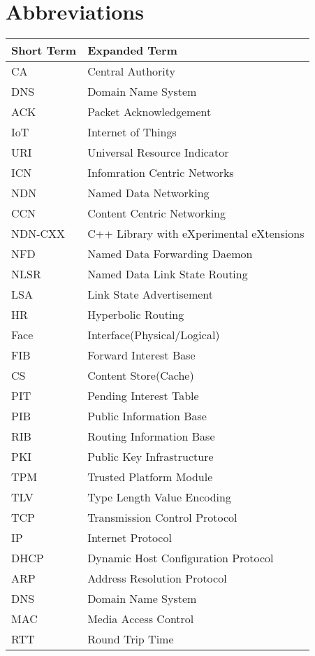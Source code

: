 \chapter{Abbreviations}

\begin{longtable}{p{40mm}|p{100mm}}
	\textbf{Short Term}&\textbf{Expanded Term}\\
	\hline
	CA & Central Authority\\
	DNS & Domain Name System\\
	ACK & Packet Acknowledgement \\ 
	IoT & Internet of Things \\  
	URI & Universal Resource Indicator \\  
	ICN & Infomration Centric Networks\\ 
	NDN & Named Data Networking \\ 
	CCN & Content Centric Networking\\ 
	NDN-CXX & C++ Library with eXperimental eXtensions \\ 
	NFD & Named Data Forwarding Daemon \\ 
	NLSR & Named Data Link State Routing \\ 
	LSA & Link State Advertisement \\ 
	HR & Hyperbolic Routing \\  
	Face & Interface(Physical/Logical)\\ 
	FIB & Forward Interest Base \\ 
	CS & Content Store(Cache) \\ 
	PIT & Pending Interest Table \\ 
	PIB & Public Information Base \\ 
	RIB & Routing Information Base \\ 
	PKI & Public Key Infrastructure \\ 
	TPM & Trusted Platform Module \\ 
	TLV & Type Length Value Encoding \\ 
	TCP & Transmission Control Protocol \\ 
	IP & Internet Protocol  \\ 
	DHCP & Dynamic Host Configuration Protocol \\ 
	ARP & Address Resolution Protocol \\ 
	DNS & Domain Name System \\ 
	MAC & Media Access Control \\ 
	RTT & Round Trip Time \\ 
\end{longtable}
